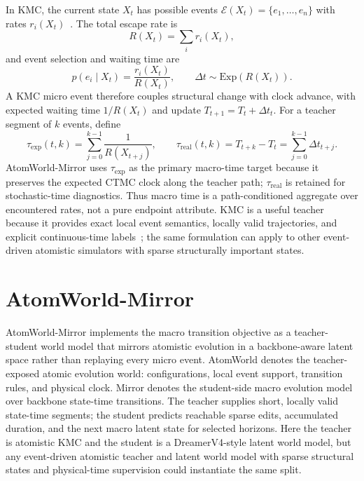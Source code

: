 \documentclass{article}
\begin{document}
In KMC, the current state $X_t$ has possible events $\mathcal{E}(X_t)=\{e_1,\ldots,e_n\}$ with rates $r_i(X_t)$~\cite{bortz1975nfold,gillespie1976general,fichthorn1991dmc}. The total escape rate is
\begin{equation}
R(X_t)=\sum_i r_i(X_t),
\end{equation}
and event selection and waiting time are
\begin{equation}
p(e_i\mid X_t)=\frac{r_i(X_t)}{R(X_t)}, \qquad \Delta t\sim \mathrm{Exp}(R(X_t)).
\end{equation}
A KMC micro event therefore couples structural change with clock advance, with expected waiting time $1/R(X_t)$ and update $T_{t+1}=T_t+\Delta t_t$. For a teacher segment of $k$ events, define
\begin{equation}
\tau_{\mathrm{exp}}(t,k)=\sum_{j=0}^{k-1}\frac{1}{R(X_{t+j})}, \qquad
\tau_{\mathrm{real}}(t,k)=T_{t+k}-T_t=\sum_{j=0}^{k-1}\Delta t_{t+j}.
\end{equation}
AtomWorld-Mirror uses $\tau_{\mathrm{exp}}$ as the primary macro-time target because it preserves the expected CTMC clock along the teacher path; $\tau_{\mathrm{real}}$ is retained for stochastic-time diagnostics. Thus macro time is a path-conditioned aggregate over encountered rates, not a pure endpoint attribute. KMC is a useful teacher because it provides exact local event semantics, locally valid trajectories, and explicit continuous-time labels~\cite{chatterjee2007kmc}; the same formulation can apply to other event-driven atomistic simulators with sparse structurally important states.

\section{AtomWorld-Mirror}

AtomWorld-Mirror implements the macro transition objective as a teacher-student world model that mirrors atomistic evolution in a backbone-aware latent space rather than replaying every micro event. AtomWorld denotes the teacher-exposed atomic evolution world: configurations, local event support, transition rules, and physical clock. Mirror denotes the student-side macro evolution model over backbone state-time transitions. The teacher supplies short, locally valid state-time segments; the student predicts reachable sparse edits, accumulated duration, and the next macro latent state for selected horizons. Here the teacher is atomistic KMC and the student is a DreamerV4-style latent world model, but any event-driven atomistic teacher and latent world model with sparse structural states and physical-time supervision could instantiate the same split.
\end{document}
